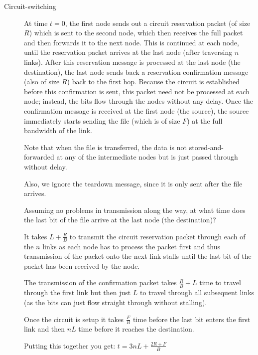 \documentclass{supervision}
\begin{document}
\begin{questions}
\begin{parts}
    \begin{description}
      \item[Circuit-switching]
      At time $t = 0$, the first node sends out a circuit reservation packet (of size $R$) which is sent to the second node, which then receives the full packet and then forwards it to the next node. This is continued at each node, until the reservation packet arrives at the last node (after traversing $n$ links). After this reservation message is processed at the last node (the destination), the last node sends back a reservation confirmation message (also of size $R$) back to the first hop. Because the circuit is established before this confirmation is sent, this packet need not be processed at each node; instead, the bits flow through the nodes without any delay. Once the confirmation message is received at the first node (the source), the source immediately starts sending the file (which is of size $F$) at the full bandwidth of the link.
      
      Note that when the file is transferred, the data is not stored-and- forwarded at any of the intermediate nodes but is just passed through without delay.
      
      Also, we ignore the teardown message, since it is only sent after the file arrives.
      
      \begin{subparts}
        \subpart
        Assuming no problems in transmission along the way, at what
time does the last bit of the file arrive at the last node (the
destination)?
        
        \begin{solution}
        It takes $L+\frac{R}{B}$ to transmit the circuit reservation packet through each of the $n$ links as each node has to process the packet first and thus transmission of the packet onto the next link stalls until the last bit of the packet has been received by the node.
        
        The transmission of the confirmation packet takes $\frac{R}{B} + L$ time to travel through the first link but then just $L$ to travel through all subsequent links (as the bits can just flow straight through without stalling).
        
        Once the circuit is setup it takes $\frac{F}{B}$ time before the last bit enters the first link and then $nL$ time before it reaches the destination.
        
        Putting this together you get:
        $t = 3nL+\frac{2R+F}{B}$
        \end{solution}


\end{subparts}
\end{description}
\end{parts}
\end{questions}
\end{document}
